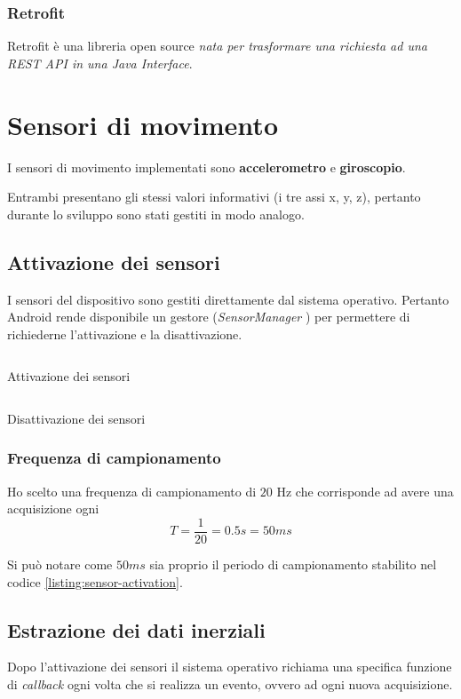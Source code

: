 \subsubsection{Retrofit}
Retrofit \cite{retrofit} è una libreria open source \textit{nata per trasformare una richiesta ad una REST API 
in una Java Interface}.


\newpage
\section{Sensori di movimento}
I sensori di movimento implementati sono \textbf{accelerometro} e \textbf{giroscopio}.

Entrambi presentano gli stessi valori informativi (i tre assi x, y, z), pertanto durante lo sviluppo sono stati gestiti in modo analogo.

\subsection{Attivazione dei sensori}
I sensori del dispositivo sono gestiti direttamente dal sistema operativo. Pertanto Android rende disponibile 
un gestore (\textit{SensorManager} \cite{sensor_manager}) per permettere di richiederne l'attivazione e la disattivazione.

\begin{listing}[H] 
    \inputminted[frame=single,framesep=10pt]{java}{assets/snippets/app/sensors/start_sensors.java}
    \caption{Attivazione dei sensori}
    \label{listing:sensor-activation}
\end{listing}
\begin{listing}[H] 
    \inputminted[frame=single,framesep=10pt]{java}{assets/snippets/app/sensors/stop_sensors.java}
    \caption{Disattivazione dei sensori}
    \label{listing:sensor-deactivation}
\end{listing}

\subsubsection{Frequenza di campionamento}
Ho scelto una frequenza di campionamento di $20$ Hz che corrisponde ad avere una acquisizione 
ogni 
$$T = \frac{1}{20} = 0.5 s = 50ms $$

\vspace{5mm} %
\noindent Si può notare come $50ms$ sia proprio il periodo di campionamento stabilito 
nel codice \ref{listing:sensor-activation}.


\subsection{Estrazione dei dati inerziali}
Dopo l'attivazione dei sensori il sistema operativo richiama una specifica funzione di \textit{callback} ogni volta 
che si realizza un evento, ovvero ad ogni nuova acquisizione.

